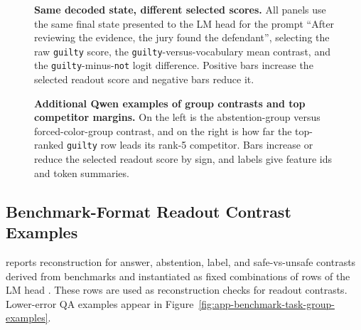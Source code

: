 \begin{figure}[!tbp]
    \centering
    \caption{\textbf{Same decoded state, different selected scores.}
    All panels use the same final state presented to the LM head for the prompt ``After reviewing
    the evidence, the jury found the defendant'', selecting the raw
    \texttt{guilty} score, the
    \texttt{guilty}-versus-vocabulary mean contrast, and the
    \texttt{guilty}-minus-\texttt{not} logit difference. Positive bars increase
    the selected readout score and negative bars reduce it.}
    \label{fig:qwen-general-readout-scores-basic}
\end{figure}

\begin{figure}[!tbp]
    \centering
    \caption{\textbf{Additional Qwen examples of group contrasts and top competitor margins.}
    On the left is the abstention-group versus forced-color-group contrast, and on
    the right is how far the top-ranked \texttt{guilty} row leads its rank-5 competitor. Bars
    increase or reduce the selected readout score by sign, and labels give feature ids and
    token summaries.}
    \label{fig:app-qwen-general-readout-scores-extra}
\end{figure}

\subsection{Benchmark-Format Readout Contrast Examples}
\label{app:benchmark-derived-display-examples}

 reports reconstruction for
answer, abstention, label, and safe-vs-unsafe contrasts derived from benchmarks
and instantiated as fixed combinations of rows of the LM head
\citep{rajpurkar2018squad2,yang2018hotpotqa,koreeda2021contractnli,guha2023legalbench,siddiq2022securityeval}.
These rows are used as reconstruction checks for readout contrasts. Lower-error QA
examples appear in Figure~\ref{fig:app-benchmark-task-group-examples}.

